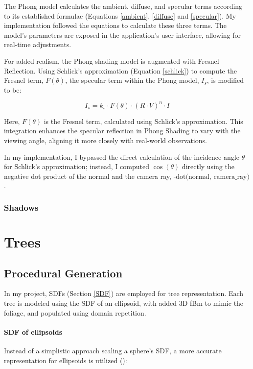 The Phong model calculates the ambient, diffuse, and specular terms according to its established formulae (Equations \ref{ambient}, \ref{diffuse} and \ref{specular}). My implementation followed the equations to calculate these three terms. The model's parameters are exposed in the application's user interface, allowing for real-time adjustments.

For added realism, the Phong shading model is augmented with Fresnel Reflection. Using Schlick's approximation (Equation \ref{schlick}) to compute the Fresnel term, $F(\theta)$, the specular term within the Phong model, $I_s$, is modified to be:

\begin{equation}
I_{s} = k_s \cdot F(\theta) \cdot (R \cdot V)^n \cdot I
\end{equation}

Here, $F(\theta)$ is the Fresnel term, calculated using Schlick's approximation. This integration enhances the specular reflection in Phong Shading to vary with the viewing angle, aligning it more closely with real-world observations.

In my implementation, I bypassed the direct calculation of the incidence angle $\theta$ for Schlick's approximation; instead, I computed $\cos(\theta)$ directly using the negative dot product of the normal and the camera ray, $\text{-dot(normal, camera\_ray)}$.

\subsubsection{Shadows}

\section{Trees}

\subsection{Procedural Generation}
\label{Tree Procedural Generation}

In my project, SDFs (Section \ref{SDF}) are employed for tree representation. Each tree is modeled using the SDF of an ellipsoid, with added 3D fBm to mimic the foliage, and populated using domain repetition. 

\paragraph{SDF of ellipsoids}
Instead of a simplistic approach scaling a sphere's SDF, a more accurate representation for ellipsoids is utilized ():

